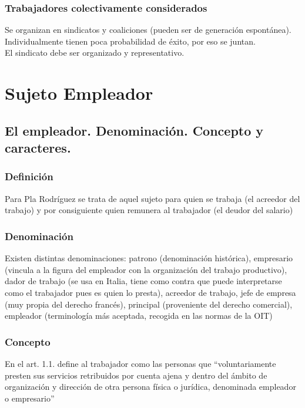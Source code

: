 \documentclass[spanish,12pt,a4paper,titlepage]{report}
\begin{document}
\subsection{Trabajadores colectivamente considerados}
Se organizan en sindicatos y coaliciones (pueden ser de generación espontánea).\\

Individualmente tienen poca probabilidad de éxito, por eso se juntan.\\

El sindicato debe ser organizado y representativo.

\chapter{Sujeto Empleador}
\section{El empleador. Denominación. Concepto y caracteres. }
\subsection{Definición}
Para Pla Rodríguez se trata de aquel sujeto para quien se trabaja (el acreedor del trabajo) y por consiguiente quien remunera al trabajador (el deudor del salario)\\
\subsection{Denominación}


Existen distintas denominaciones: patrono (denominación histórica), empresario (vincula a la figura del empleador con la organización del trabajo productivo), dador de trabajo (se usa en Italia, tiene como contra que puede interpretarse como el trabajador pues es quien lo presta), acreedor de trabajo, jefe de empresa (muy propia del derecho francés), principal (proveniente del derecho comercial), empleador (terminología más aceptada, recogida en las normas de la OIT)

\subsection{Concepto}

En el art. 1.1. define al trabajador como las personas que “voluntariamente presten sus servicios retribuidos por cuenta ajena y dentro del ámbito de organización y dirección de otra persona física o jurídica, denominada empleador o empresario”
\end{document}
